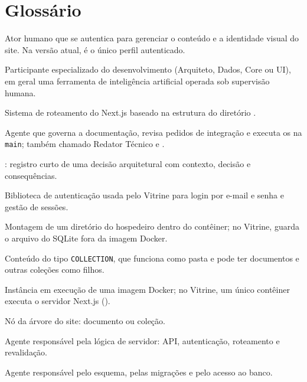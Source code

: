\chapter{Glossário}\label{ap:glossario}

\begin{description}[style=nextline, leftmargin=0.6cm, itemsep=4pt]
  \item[Administrador] Ator humano que se autentica para gerenciar o conteúdo e a identidade visual do site. Na versão atual, é o único perfil autenticado.
  \item[Agente] Participante especializado do desenvolvimento (Arquiteto, Dados, Core ou UI), em geral uma ferramenta de inteligência artificial operada sob supervisão humana.
  \item[App Router] Sistema de roteamento do Next.js baseado na estrutura do diretório .
  \item[Arquiteto] Agente que governa a documentação, revisa pedidos de integração e executa os  na \texttt{main}; também chamado Redator Técnico e .
  \item[ADR] : registro curto de uma decisão arquitetural com contexto, decisão e consequências.
  \item[better-auth] Biblioteca de autenticação usada pelo Vitrine para login por e-mail e senha e gestão de sessões.
  \item[\en{Bind mount}] Montagem de um diretório do hospedeiro dentro do contêiner; no Vitrine, guarda o arquivo do SQLite fora da imagem Docker.
  \item[Coleção] Conteúdo do tipo \texttt{COLLECTION}, que funciona como pasta e pode ter documentos e outras coleções como filhos.
  \item[Contêiner] Instância em execução de uma imagem Docker; no Vitrine, um único contêiner executa o servidor Next.js ().
  \item[Conteúdo] Nó da árvore do site: documento ou coleção.
  \item[Core] Agente responsável pela lógica de servidor: API, autenticação, roteamento e revalidação.
  \item[Dados] Agente responsável pelo esquema, pelas migrações e pelo acesso ao banco.

\end{description}
